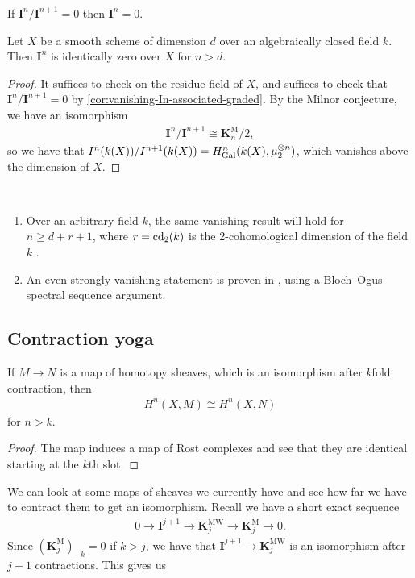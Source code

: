 \documentclass[11pt,openany]{book}
\providecommand{\KM}{\mathbf{K}^\mathrm{M}}
\providecommand{\KMW}{\mathbf{K}^\mathrm{MW}}
\begin{document}
\begin{corollary}\label{cor:vanishing-In-associated-graded} 
If $\mathbf{I}^n / \mathbf{I}^{n+1} = 0$ then $\mathbf{I}^n = 0$.
\end{corollary}




\begin{theorem} Let $X$ be a smooth scheme of dimension $d$ over an algebraically closed field $k$. Then $\mathbf{I}^{n}$ is identically zero over $X$ for $n>d$.
\end{theorem}
\begin{proof} It suffices to check on the residue field of $X$, and suffices to check that $\mathbf{I}^n/\mathbf{I}^{n+1} = 0$ by \autoref{cor:vanishing-In-associated-graded}. By the Milnor conjecture, we have an isomorphism
\begin{align*}
    \mathbf{I}^n/\mathbf{I}^{n+1} \cong \KM_n/2,
\end{align*}
so we have that $I^n(k(X))/I^{n+1}(k(X)) = H^n_{\mathrm{Gal}}(k(X), \mu_2^{\otimes n})$, which vanishes above the dimension of $X$. 
\end{proof}

\begin{remark} \,
\begin{enumerate}
    \item Over an arbitrary field $k$, the same vanishing result will hold for $n \ge d+r+1$, where $r = \mathrm{cd}_2(k)$ is the 2-cohomological dimension of the field $k$ \cite[5.1]{AF3}.
    \item An even strongly vanishing statement is proven in \cite[5.2]{AF3}, using a Bloch--Ogus spectral sequence argument.
\end{enumerate}
\end{remark}

\subsection{Contraction yoga}

\begin{proposition} If $M\to N$ is a map of homotopy sheaves, which is an isomorphism after $k$fold contraction, then
\begin{align*}
    H^n(X,M) \cong H^n(X,N)
\end{align*}
for $n >k$.
\end{proposition}
\begin{proof} The map induces a map of Rost complexes and see that they are identical starting at the $k$th slot.
\end{proof}
%
We can look at some maps of sheaves we currently have and see how far we have to contract them to get an isomorphism. Recall we have a short exact sequence
\begin{align*}
    0 \to \mathbf{I}^{j+1} \to \KMW_j \to \KM_j \to 0.
\end{align*}
Since $(\KM_j)_{-k} = 0$ if $k>j$, we have that $\mathbf{I}^{j+1} \to \KMW_j$ is an isomorphism after $j+1$ contractions. This gives us
\end{document}
